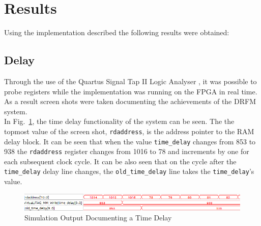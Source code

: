 \section{Results} \label{sec:Results}
\noindent Using the implementation described the following results were obtained:
\subsection{Delay}
\noindent Through the use of the Quartus Signal Tap II Logic Analyser \cite{Signal_Tap}, it was possible to probe registers while the implementation was running on the FPGA in real time. As a result screen shots were taken documenting the achievements of the DRFM system. \\ \newline In Fig.~\ref{fig:delay}, the time delay functionality of the system can be seen. The the topmost value of the screen shot, \texttt{rdaddress}, is the address pointer to the RAM delay block. It can be seen that when the value \texttt{time\_delay} changes from 853 to 938 the \texttt{rdaddress} register changes from 1016 to 78 and increments by one for each subsequent clock cycle. It can be also seen that on the cycle after the \texttt{time\_delay} delay line changes, the \texttt{old\_time\_delay} line takes the \texttt{time\_delay}'s value. 
\begin{figure}[h!]
	\centering
	\includegraphics[width=\linewidth]{img/delay}
	\caption{Simulation Output Documenting a Time Delay}
	\label{fig:delay}
\end{figure}

